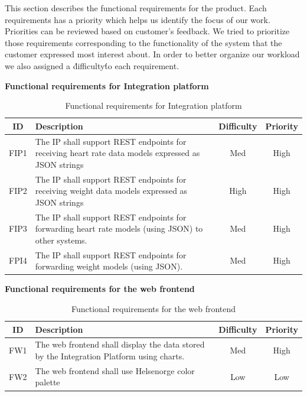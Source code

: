 This section describes the functional requirements for the product.
Each requirements has a priority which helps us identify the focus of our work.
Priorities can be reviewed based on customer's feedback. We tried to prioritize those requirements corresponding to the functionality of the system that the customer expressed most interest about. In order to better organize our workload we also assigned a \'difficulty\' to each requirement.

\textbf{Functional requirements for Integration platform}

\begin{table}[h]
\begin{center}
\begin{tabular}{ | c | p{9cm} | c | c | }
  \hline
  ID & Description & Difficulty & Priority\\
  \hline\noalign{\smallskip}\noalign{\smallskip}\hline
  FIP1	& The IP shall support REST endpoints for receiving heart rate data models expressed as JSON strings	& Med	& High \\
  FIP2	& The IP shall support REST endpoints for receiving weight data models expressed as JSON strings 		& High	& High \\
  FIP3	& The IP shall support REST endpoints for forwarding heart rate models (using JSON) to other systems.	& Med	& High \\
  FPI4	& The IP shall support REST endpoints for forwarding weight models (using JSON).						& Med	& High \\
  \hline
\end{tabular}
\end{center}
\caption{Functional requirements for Integration platform}
\label{table:reqip}
\end{table}

\textbf{Functional requirements for the web frontend}

\begin{table}[h]
\begin{center}
\begin{tabular}{ | c | p{9cm} | c | c |}
  \hline
  ID & Description & Difficulty & Priority\\
  \hline\noalign{\smallskip}\noalign{\smallskip}\hline
  FW1	& The web frontend shall display the data stored by the Integration Platform using charts.	& Med	& High \\
  FW2	& The web frontend shall use Helsenorge color palette										& Low	& Low \\
  \hline
\end{tabular}
\end{center}
\caption{Functional requirements for the web frontend}
\label{table:reqfrontend}
\end{table}

